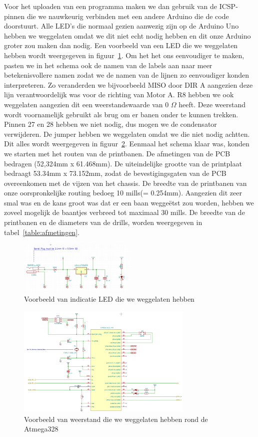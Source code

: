 Voor het uploaden van een programma maken we dan gebruik van de ICSP-pinnen die we nauwkeurig verbinden met een andere Arduino die de code doorstuurt.  Alle LED's die normaal gezien aanwezig zijn op de Arduino Uno hebben we  weggelaten omdat we dit niet echt nodig hebben en dit onze Arduino groter zou maken dan nodig. Een voorbeeld van een LED die we weggelaten hebben wordt weergegeven in figuur~\ref{fig:regulator}. Om het het ons eenvoudiger te maken, pasten we in het schema ook de namen van de labels aan naar meer betekenisvollere namen zodat we de namen van de lijnen zo eenvoudiger konden interpreteren. Zo veranderden we bijvoorbeeld MISO door DIR A aangezien deze lijn verantwoordelijk was voor de richting van Motor A. R8 hebben we ook weggelaten aangezien dit een weerstandswaarde van 0 $\Omega$ heeft. Deze weerstand wordt voornamelijk gebruikt als brug om er banen onder te kunnen trekken. Pinnen 27 en 28 hebben we niet nodig, dus mogen we de condensator verwijderen. De jumper hebben we weggelaten omdat we die niet nodig achtten. Dit alles wordt weergegeven in figuur~\ref{fig:atmega}. Eenmaal het schema klaar was, konden we starten met het routen van de printbanen. De afmetingen van de PCB bedragen (52,324mm x 61.468mm). De uiteindelijke grootte van de printplaat bedraagt 53.34mm x 73.152mm, zodat de bevestigingsgaten van de PCB overeenkomen met de vijzen van het chassis.  De breedte van de printbanen van onze oorspronkelijke routing bedoeg 10 mills(= 0.254mm). Aangezien dit zeer smal was en de kans groot was dat er een baan wegge\"etst zou worden, hebben we zoveel mogelijk de baantjes verbreed tot maximaal 30 mills. De breedte van de printbanen en de diameters van de drills, worden weergegeven in tabel~\ref{table:afmetingen}.\\
\begin{figure}[h]
\centering
\includegraphics[width=0.5\textwidth]{Voltage_Regulator.png}
\caption{Voorbeeld van indicatie LED die we weggelaten hebben}
\label{fig:regulator}
\end{figure}

\begin{figure}[h]
\centering
\includegraphics[width=0.75\textwidth]{Atmega.png}
\caption{Voorbeeld van weerstand die we weggelaten hebben rond de Atmega328}
\label{fig:atmega}
\end{figure}

